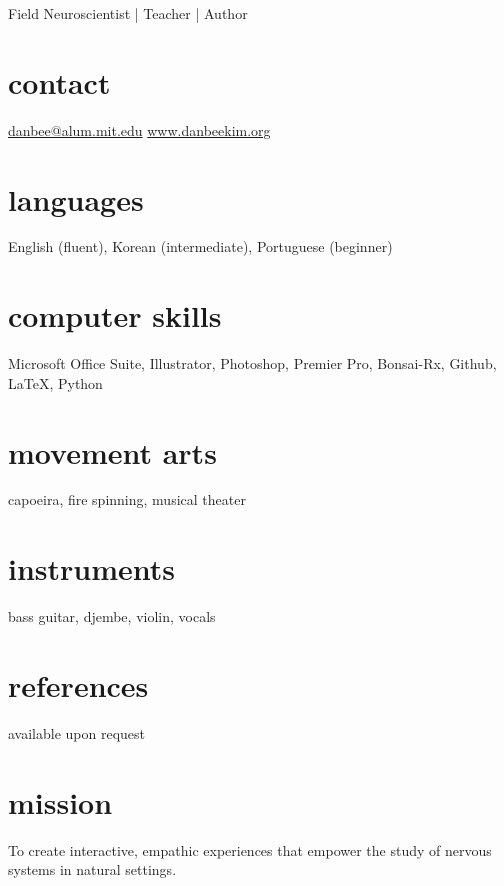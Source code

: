 \documentclass[]{friggeri-cv}
\begin{document}
       {Field Neuroscientist | Teacher | Author}


\begin{aside}
  \section{contact}
    \href{mailto:danbee@alum.mit.edu}{danbee@alum.mit.edu}
    \href{www.danbeekim.org}{www.danbeekim.org}
  \section{languages}
    English (fluent),
    Korean (intermediate),
    Portuguese (beginner)
  \section{computer skills}
    Microsoft Office Suite, 
	Illustrator, Photoshop, 
	Premier Pro, Bonsai-Rx, 
	Github, \LaTeX, Python
  \section{movement arts}
    capoeira, fire spinning,
    musical theater
  \section{instruments}
    bass guitar, djembe,
    violin, vocals
  \section{references}
    available upon request        
\end{aside}

\section{mission}
To create interactive, empathic experiences that empower the study of nervous systems in natural settings. \\
\end{document}
